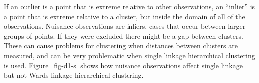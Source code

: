 \documentclass[
  letterpaper,
]{book}
\newenvironment{Shaded}{\begin{snugshade}}{\end{snugshade}}
\newcommand{\AttributeTok}[1]{\textcolor[rgb]{0.40,0.45,0.13}{#1}}
\newcommand{\CommentTok}[1]{\textcolor[rgb]{0.37,0.37,0.37}{#1}}
\newcommand{\ConstantTok}[1]{\textcolor[rgb]{0.56,0.35,0.01}{#1}}
\newcommand{\DecValTok}[1]{\textcolor[rgb]{0.68,0.00,0.00}{#1}}
\newcommand{\FloatTok}[1]{\textcolor[rgb]{0.68,0.00,0.00}{#1}}
\newcommand{\FunctionTok}[1]{\textcolor[rgb]{0.28,0.35,0.67}{#1}}
\newcommand{\NormalTok}[1]{\textcolor[rgb]{0.00,0.23,0.31}{#1}}
\newcommand{\OtherTok}[1]{\textcolor[rgb]{0.00,0.23,0.31}{#1}}
\newcommand{\SpecialCharTok}[1]{\textcolor[rgb]{0.37,0.37,0.37}{#1}}
\newcommand{\StringTok}[1]{\textcolor[rgb]{0.13,0.47,0.30}{#1}}
\begin{document}
If an outlier is a point that is extreme relative to other observations,
an ``inlier'' is a point that is extreme relative to a cluster, but
inside the domain of all of the observations. Nuisance observations are
inliers, cases that occur between larger groups of points. If they were
excluded there might be a gap between clusters. These can cause problems
for clustering when distances between clusters are measured, and can be
very problematic when single linkage hierarchical clustering is used.
Figure~\ref{fig-d1-s} shows how nuisance observations affect single
linkage but not Wards linkage hierarchical clustering.

\begin{Shaded}
\end{Shaded}
\end{document}
